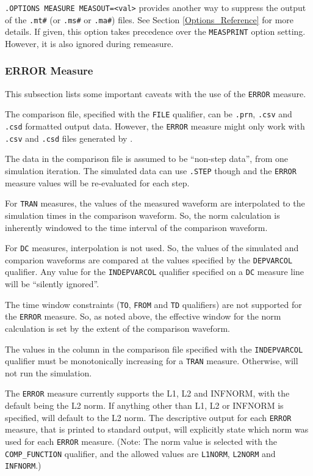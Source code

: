 \texttt{.OPTIONS MEASURE MEASOUT=<val>} provides another way to suppress the output
of the \texttt{.mt\#} (or \texttt{.ms\#} or \texttt{.ma\#}) files.  See Section \ref{Options_Reference} 
for more details.  If given, this option takes precedence over the \texttt{MEASPRINT} 
option setting.  However, it is also ignored during remeasure.

\subsubsection{ERROR Measure}
\label{Measure_Error_Measure}
This subsection lists some important caveats with the use of the \texttt{ERROR}
measure.
\begin{XyceItemize}
  \item The comparison file, specified with the {\tt FILE} qualifier, can be {\tt .prn}, 
    {\tt .csv} and {\tt .csd} formatted output data.   However, the {\tt ERROR} measure
    might only work with {\tt .csv} and {\tt .csd} files generated by \Xyce{}.
  \item The data in the comparison file is assumed to be ``non-step data'', from one
    simulation iteration.  The simulated data can use {\tt .STEP} though and the {\tt ERROR}
    measure values will be re-evaluated for each step.
  \item For {\tt TRAN} measures, the values of the measured waveform are interpolated to the 
    simulation times in the comparison waveform.  So, the norm calculation is inherently 
    windowed to the time interval of the comparison waveform.
  \item For {\tt DC} measures, interpolation is not used.  So, the values of the simulated
    and comparion waveforms are compared at the values specified by the {\tt DEPVARCOL}
    qualifier.  Any value for the {\tt INDEPVARCOL} qualifier specified on a 
    {\tt DC} measure line will be ``silently ignored''. 
  \item The time window constraints ({\tt TO}, {\tt FROM} and {\tt TD} qualifiers) are not 
    supported for the {\tt ERROR} measure.  So, as noted above, the effective window for the 
    norm calculation is set by the extent of the comparison waveform.
  \item The values in the column in the comparison file specified with the {\tt INDEPVARCOL}
    qualifier must be monotonically increasing for a {\tt TRAN} measure.  Otherwise, 
    \Xyce{} will not run the simulation.
  \item The {\tt ERROR} measure currently supports the L1, L2 and INFNORM, with the default 
    being the L2 norm.  If anything other than L1, L2 or INFNORM is specified, \Xyce{} will
    default to the L2 norm.  The descriptive output for each {\tt ERROR} measure, that 
    is printed to standard output, will explicitly state which norm was used for each
    {\tt ERROR} measure.  (Note: The norm value is selected with the {\tt COMP\_FUNCTION} 
    qualifier, and the allowed values are {\tt L1NORM}, {\tt L2NORM} and {\tt INFNORM}.)

\end{XyceItemize}

